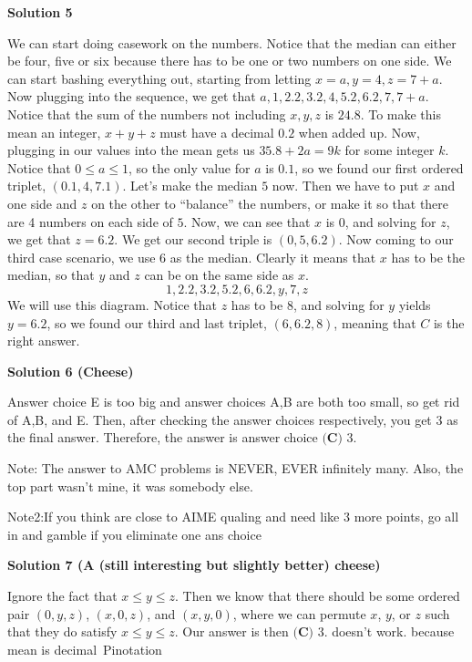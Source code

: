 \begin{enumerate}
\textbf{Solution 5}

We can start doing casework on the numbers. Notice that the median can either be four, five or six because there has to be one or two numbers on one side. We can start bashing everything out, starting from letting $x=a, y=4, z=7+a$. Now plugging into the sequence, we get that $a, 1, 2.2, 3.2, 4, 5.2, 6.2, 7, 7+a$. Notice that the sum of the numbers not including $x, y, z$ is $24.8$. To make this mean an integer, $x+y+z$ must have a decimal $0.2$ when added up. Now, plugging in our values into the mean gets us $35.8+2a=9k$ for some integer $k$. Notice that $0\leq a\leq 1$, so the only value for $a$ is $0.1$, so we found our first ordered triplet, $(0.1, 4, 7.1)$. Let’s make the median $5$ now. Then we have to put $x$ and one side and $z$ on the other to “balance” the numbers, or make it so that there are 4 numbers on each side of $5$. Now, we can see that $x$ is $0$, and solving for $z$, we get that $z=6.2$. We get our second triple is $(0, 5, 6.2)$. Now coming to our third case scenario, we use $6$ as the median. Clearly it means that $x$ has to be the median, so that $y$ and $z$ can be on the same side as $x$. 
 \[1, 2.2, 3.2, 5.2, 6, 6.2, y, 7, z\] We will use this diagram. Notice that $z$ has to be $8$, and solving for $y$ yields $y=6.2$, so we found our third and last triplet, $(6, 6.2, 8)$, meaning that $\boxed{C}$ is the right answer.

 



\textbf{Solution 6 (Cheese)}

Answer choice E is too big and answer choices A,B are both too small, so get rid of A,B, and E. Then, after checking the answer choices respectively, you get 3 as the final answer. Therefore, the answer is answer choice $\boxed{\textbf{(C) }3}$.

 
Note: The answer to AMC problems is NEVER, EVER infinitely many. Also, the top part wasn't mine, it was somebody else. 

 Note2:If you think are close to AIME qualing and need like 3 more points, go all in and gamble if you eliminate one ans choice

 



\textbf{Solution 7 (A (still interesting but slightly better) cheese)}

Ignore the fact that \( x \le y \le z \). Then we know that there should be some ordered pair \((0,y,z)\), \((x,0,z)\), and \((x,y,0)\), where we can permute \( x \), \( y \), or \( z \) such that they do satisfy \( x \le y \le z \). Our answer is then \(\boxed{\textbf{(C) }3}\). doesn't work. because mean is decimal~Pinotation


\end{enumerate}
